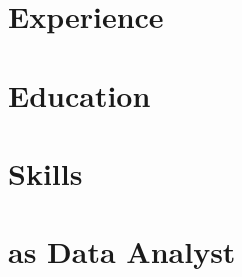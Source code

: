 \def\sitepage{professional}
\section{Experience}





\section{Education}







\clearpage




\section{Skills}
\begin{cvcolumns}
  
  
  
\end{cvcolumns}


\section{\textmd{as} Data Analyst}


